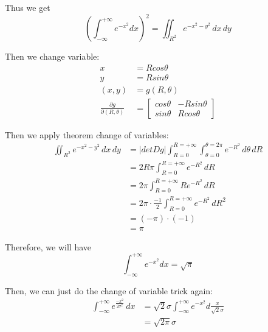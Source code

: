 \documentclass[12pt]{article}
\begin{document}
Thus we get
\[
  (\int_{-\infty}^{+\infty}e^{-x^2}dx)^2 = \iint_{R^2}e^{-x^2-y^2} \,dx \,dy
\]

Then we change variable:
\begin{align}
  x &= Rcos\theta\\
  y &= Rsin\theta\\
  (x, y) &= g(R, \theta)\\
  \frac{\partial g}{\partial (R, \theta)}
    &= \begin{bmatrix}
      cos\theta & -Rsin\theta\\
      sin\theta & Rcos\theta
      \end{bmatrix}
\end{align}

Then we apply theorem change of variables:
\begin{align}
  \iint_{R^2}e^{-x^2-y^2} \,dx \,dy &= |det Dg|\int_{R=0}^{R=+\infty}\int_{\theta=0}^{\theta=2\pi}e^{-R^2} \,d\theta \,dR\\
                                    &= 2R\pi \int_{R=0}^{R=+\infty}e^{-R^2} \,dR\\
                                    &= 2\pi \int_{R=0}^{R=+\infty}Re^{-R^2} \,dR\\
                                    &= 2\pi \cdot \frac{-1}{2} \int_{R=0}^{R=+\infty}e^{-R^2} \,dR^2\\
                                    &= (-\pi) \cdot (-1)\\
                                    &= \pi
\end{align}

Therefore, we will have
\[
  \int_{-\infty}^{+\infty}e^{-x^2}dx = \sqrt{\pi}
\]

Then, we can just do the change of variable trick again:
\begin{align}
  \int_{-\infty}^{+\infty}e^{\frac{-x^2}{2\sigma^2}} \,dx &= \sqrt{2}\sigma \int_{-\infty}^{+\infty}e^{-x^2}d\frac{x}{\sqrt{2}\sigma}\\
                                                      &= \sqrt{2\pi}\sigma\\
\end{align}
\end{document}
